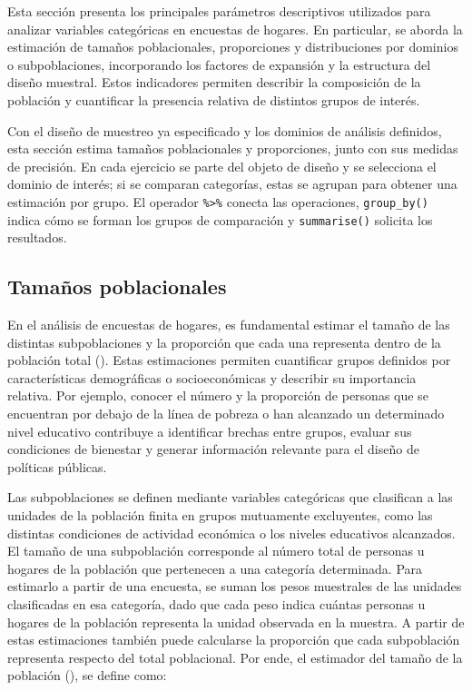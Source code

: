 \documentclass[
  spanish,
  11pt,
  letterpaper,
  oneside,
  open=any]{scrbook}
\begin{document}
Esta sección presenta los principales parámetros descriptivos utilizados
para analizar variables categóricas en encuestas de hogares. En
particular, se aborda la estimación de tamaños poblacionales,
proporciones y distribuciones por dominios o subpoblaciones,
incorporando los factores de expansión y la estructura del diseño
muestral. Estos indicadores permiten describir la composición de la
población y cuantificar la presencia relativa de distintos grupos de
interés.

Con el diseño de muestreo ya especificado y los dominios de análisis
definidos, esta sección estima tamaños poblacionales y proporciones,
junto con sus medidas de precisión. En cada ejercicio se parte del
objeto de diseño y se selecciona el dominio de interés; si se comparan
categorías, estas se agrupan para obtener una estimación por grupo. El
operador \texttt{\%\textgreater{}\%} conecta las operaciones,
\texttt{group\_by()} indica cómo se forman los grupos de comparación y
\texttt{summarise()} solicita los resultados.

\subsection{Tamaños
poblacionales}\label{sec-estimacion-del-tamano-poblacional}

En el análisis de encuestas de hogares, es fundamental estimar el tamaño
de las distintas subpoblaciones y la proporción que cada una representa
dentro de la población total (). Estas estimaciones permiten cuantificar grupos definidos por
características demográficas o socioeconómicas y describir su
importancia relativa. Por ejemplo, conocer el número y la proporción de
personas que se encuentran por debajo de la línea de pobreza o han
alcanzado un determinado nivel educativo contribuye a identificar
brechas entre grupos, evaluar sus condiciones de bienestar y generar
información relevante para el diseño de políticas públicas.

Las subpoblaciones se definen mediante variables categóricas que
clasifican a las unidades de la población finita en grupos mutuamente
excluyentes, como las distintas condiciones de actividad económica o los
niveles educativos alcanzados. El tamaño de una subpoblación corresponde
al número total de personas u hogares de la población que pertenecen a
una categoría determinada. Para estimarlo a partir de una encuesta, se
suman los pesos muestrales de las unidades clasificadas en esa
categoría, dado que cada peso indica cuántas personas u hogares de la
población representa la unidad observada en la muestra. A partir de
estas estimaciones también puede calcularse la proporción que cada
subpoblación representa respecto del total poblacional. Por ende, el
estimador del tamaño de la población
(), se define como:
\end{document}
